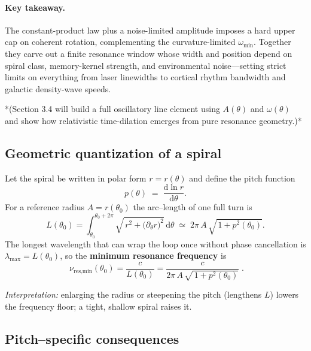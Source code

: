 \medskip
\paragraph{Key takeaway.}  
The constant-product law plus a noise-limited amplitude imposes a hard upper cap on coherent rotation, complementing the curvature-limited \(\omega_{\min}\).  Together they carve out a finite resonance window whose width and position depend on spiral class, memory-kernel strength, and environmental noise—setting strict limits on everything from laser linewidths to cortical rhythm bandwidth and galactic density-wave speeds.

*(Section 3.4 will build a full oscillatory line element using \(A(\theta)\) and \(\omega(\theta)\) and show how relativistic time-dilation emerges from pure resonance geometry.)*  

\subsection{Geometric quantization of a spiral}

Let the spiral be written in polar form $r=r(\theta)$ and define the pitch
function
\[
  p(\theta)\;=\;\frac{\mathrm d\!\ln r}{\mathrm d\theta}.
\]
For a reference radius $A=r(\theta_0)$ the arc–length of one full turn is
\[
  L(\theta_0)=
  \!\!\int_{\theta_0}^{\theta_0+2\pi}
  \sqrt{\,r^2+\bigl(\partial_\theta r\bigr)^2}\,\mathrm d\theta
  \;\simeq\;2\pi\,A\,\sqrt{\,1+p^2(\theta_0)}.
\]
The longest wavelength that can wrap the loop once without phase
cancellation is $\lambda_{\max}=L(\theta_0)$, so the
\textbf{minimum resonance frequency} is
\begin{equation}
  \boxed{\;
  \nu_{\text{res,min}}(\theta_0)=
  \frac{c}{L(\theta_0)}=
  \frac{c}{2\pi\,A\,\sqrt{\,1+p^2(\theta_0)}}\;
  }.
  \label{eq:nuresmin}
\end{equation}

\medskip
\noindent
\textit{Interpretation:} enlarging the radius or steepening the pitch
(lengthens $L$) lowers the frequency floor; a tight, shallow spiral raises it.

\subsection{Pitch–specific consequences}

